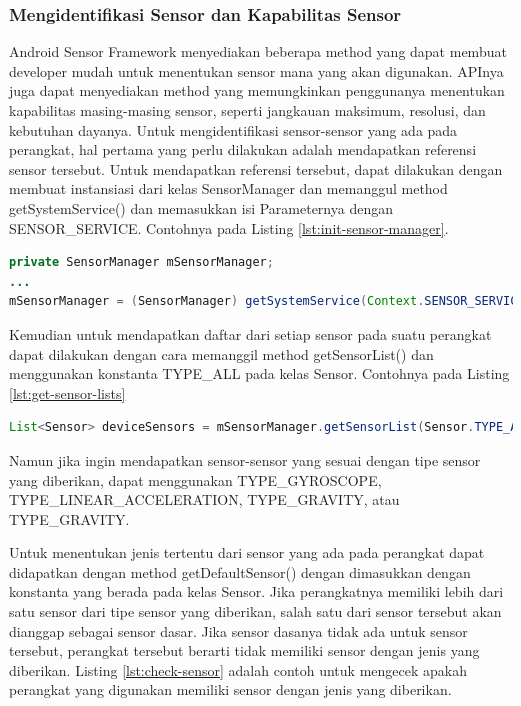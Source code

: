 \subsubsection{Mengidentifikasi Sensor dan Kapabilitas Sensor}
\label{sssec:mengidentifikasi_sensor_dan_kapabilitas_sensor}
Android Sensor Framework menyediakan beberapa method yang dapat membuat developer mudah untuk menentukan sensor mana yang akan digunakan. APInya juga dapat menyediakan method yang memungkinkan penggunanya menentukan kapabilitas masing-masing sensor, seperti jangkauan maksimum, resolusi, dan kebutuhan dayanya.
Untuk mengidentifikasi sensor-sensor yang ada pada perangkat, hal pertama yang perlu dilakukan adalah mendapatkan referensi sensor tersebut. Untuk mendapatkan referensi tersebut, dapat dilakukan dengan membuat instansiasi dari kelas SensorManager dan memanggul method getSystemService() dan memasukkan isi Parameternya dengan SENSOR\_SERVICE. Contohnya pada Listing \ref{lst:init-sensor-manager}.
 
\begin{lstlisting}[caption={Contoh inisialisasi kelas SensorManager},label={lst:init-sensor-manager},language=java]
private SensorManager mSensorManager;
...
mSensorManager = (SensorManager) getSystemService(Context.SENSOR_SERVICE);
\end{lstlisting}

Kemudian untuk mendapatkan daftar dari setiap sensor pada suatu perangkat dapat dilakukan dengan cara memanggil method getSensorList() dan menggunakan konstanta TYPE\_ALL pada kelas Sensor. Contohnya pada Listing \ref{lst:get-sensor-lists}

\begin{lstlisting}[caption={Contoh untuk mendapatkan daftar dari setiap sensor yang ada},label={lst:get-sensor-lists},language=java]
List<Sensor> deviceSensors = mSensorManager.getSensorList(Sensor.TYPE_ALL);
\end{lstlisting}

Namun jika ingin mendapatkan sensor-sensor yang sesuai dengan tipe sensor yang diberikan, dapat menggunakan TYPE\_GYROSCOPE, TYPE\_LINEAR\_ACCELERATION, TYPE\_GRAVITY, atau TYPE\_GRAVITY.

Untuk menentukan jenis tertentu dari sensor yang ada pada perangkat dapat didapatkan dengan method getDefaultSensor() dengan dimasukkan dengan konstanta yang berada pada kelas Sensor. Jika perangkatnya memiliki lebih dari satu sensor dari tipe sensor yang diberikan, salah satu dari sensor tersebut akan dianggap sebagai sensor dasar. Jika sensor dasanya tidak ada untuk sensor tersebut, perangkat tersebut berarti tidak memiliki sensor dengan jenis yang diberikan. Listing \ref{lst:check-sensor} adalah contoh untuk mengecek apakah perangkat yang digunakan memiliki sensor dengan jenis yang diberikan.

